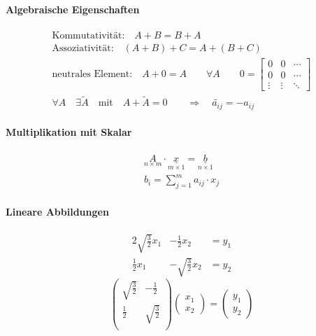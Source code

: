 \paragraph{Algebraische Eigenschaften}
\begin{gather}
  \text{Kommutativit\"at:} \quad A+B = B+A \\
  \text{Assoziativit\"at:} \quad (A+B)+C = A+(B+C) \\
  \text{neutrales Element:} \quad A+0 = A \qquad \forall A \qquad
	0=\begin{bmatrix}
		0 & 0 & \cdots \\
		0 & 0 & \cdots \\
		\vdots & \vdots & \ddots
	\end{bmatrix} \\
  \forall A \quad \exists \widetilde{A} \quad\text{mit}\quad A+\widetilde{A} = 0
	\qquad\Longrightarrow\quad \widetilde{a_{ij}} = -a_{ij}
\end{gather}

\paragraph{Multiplikation mit Skalar}
\begin{gather}
  \underset{n\times m}{A} \cdot \underset{m\times 1}{\underline{x}} = \underset{n\times 1}{\underline{b}} \\
  b_i = \sum_{j=1}^m a_{ij}\cdot x_j
\end{gather}

\paragraph{Lineare Abbildungen}
\begin{alignat}{2}
  \sqrt{\frac{3}{2}}x_1 &- \frac{1}{2}x_2 &= y_1 \\
  \frac{1}{2}x_1 &- \sqrt{\frac{3}{2}}x_2 &= y_2
\end{alignat}
\begin{equation}
  \begin{pmatrix}
	\sqrt{\frac{3}{2}} & -\frac{1}{2} \\
	\frac{1}{2} & \sqrt{\frac{3}{2}} \\
  \end{pmatrix}
  \begin{pmatrix}
	x_1 \\ x_2
  \end{pmatrix} =
  \begin{pmatrix}
	y_1 \\ y_2
  \end{pmatrix}
\end{equation}


